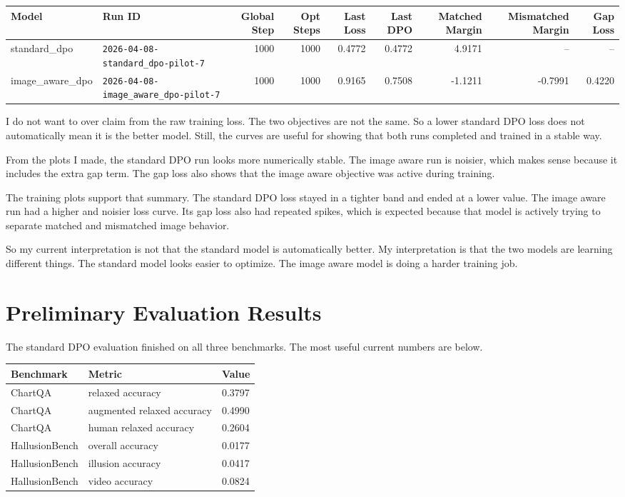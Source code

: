 \documentclass[11pt]{article}
\begin{document}
\begin{center}
\begin{tabular}{>{\raggedright}p{2.3cm} >{\raggedright}p{4.1cm} r r r r r r r}
\toprule
Model & Run ID & Global Step & Opt Steps & Last Loss & Last DPO & Matched Margin & Mismatched Margin & Gap Loss \\
\midrule
standard\_dpo & \texttt{2026-04-08-standard\_dpo-pilot-7} & 1000 & 1000 & 0.4772 & 0.4772 & 4.9171 & -- & -- \\
image\_aware\_dpo & \texttt{2026-04-08-image\_aware\_dpo-pilot-7} & 1000 & 1000 & 0.9165 & 0.7508 & -1.1211 & -0.7991 & 0.4220 \\
\bottomrule
\end{tabular}
\end{center}

I do not want to over claim from the raw training loss.
The two objectives are not the same.
So a lower standard DPO loss does not automatically mean it is the better model.
Still, the curves are useful for showing that both runs completed and trained in a stable way.

From the plots I made, the standard DPO run looks more numerically stable.
The image aware run is noisier, which makes sense because it includes the extra gap term.
The gap loss also shows that the image aware objective was active during training.

The training plots support that summary.
The standard DPO loss stayed in a tighter band and ended at a lower value.
The image aware run had a higher and noisier loss curve.
Its gap loss also had repeated spikes, which is expected because that model is actively trying to separate matched and mismatched image behavior.

So my current interpretation is not that the standard model is automatically better.
My interpretation is that the two models are learning different things.
The standard model looks easier to optimize.
The image aware model is doing a harder training job.

\section*{Preliminary Evaluation Results}
The standard DPO evaluation finished on all three benchmarks.
The most useful current numbers are below.

\begin{center}
\begin{tabular}{lll}
\toprule
Benchmark & Metric & Value \\
\midrule
ChartQA & relaxed accuracy & 0.3797 \\
ChartQA & augmented relaxed accuracy & 0.4990 \\
ChartQA & human relaxed accuracy & 0.2604 \\
HallusionBench & overall accuracy & 0.0177 \\
HallusionBench & illusion accuracy & 0.0417 \\
HallusionBench & video accuracy & 0.0824 \\
\bottomrule
\end{tabular}
\end{center}
\end{document}

